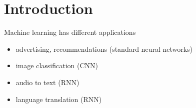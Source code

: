 \documentclass{article}
\begin{document}
\section{Introduction}
Machine learning has different applications
\begin{itemize}
\item advertising, recommendations (standard neural networks)
\item image classification (CNN)
\item audio to text (RNN)
\item language translation (RNN)
\end{itemize}
\end{document}
